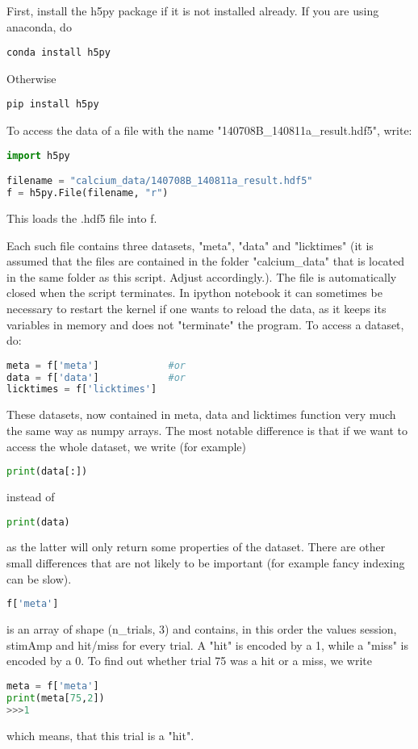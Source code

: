 \documentclass[12pt]{article}
\begin{document}
\maketitle
First, install the h5py package if it is not installed already. If you are using anaconda, do
\begin{lstlisting}
conda install h5py
\end{lstlisting}
Otherwise
\begin{lstlisting}
pip install h5py
\end{lstlisting}
To access the data of a file with the name "140708B\_140811a\_result.hdf5", write:

\begin{lstlisting}[language=Python]
import h5py

filename = "calcium_data/140708B_140811a_result.hdf5"
f = h5py.File(filename, "r")
\end{lstlisting}
This loads the .hdf5 file into f.

Each such file contains three datasets, "meta", "data" and "licktimes" (it is assumed that the files are contained in the folder "calcium\_data" that is located in the same folder as this script. Adjust accordingly.). The file is automatically closed when the script terminates. In ipython notebook it can sometimes be necessary to restart the kernel if one wants to reload the data, as it keeps its variables in memory and does not "terminate" the program. To access a dataset, do:
\begin{lstlisting}[language=Python]
meta = f['meta']			#or
data = f['data']			#or
licktimes = f['licktimes']
\end{lstlisting}
These datasets, now contained in meta, data and licktimes function very much the same way as numpy arrays. The most notable difference is that if we want to access the whole dataset, we write (for example)
\begin{lstlisting}[language=Python]
print(data[:])
\end{lstlisting}
instead of
\begin{lstlisting}[language=Python]
print(data)
\end{lstlisting}
as the latter will only return some properties of the dataset. There are other small differences that are not likely to be important (for example fancy indexing can be slow). \newline

\begin{lstlisting}[language=Python]
f['meta']
\end{lstlisting}
is an array of shape (n\_trials, 3) and contains, in this order the values session, stimAmp and hit/miss for every trial. A "hit" is encoded by a 1, while a "miss" is encoded by a 0. To find out whether trial 75 was a hit or a miss, we write
\begin{lstlisting}[language=Python]
meta = f['meta']
print(meta[75,2])
>>>1
\end{lstlisting}
which means, that this trial is a "hit". \newline
\end{document}
